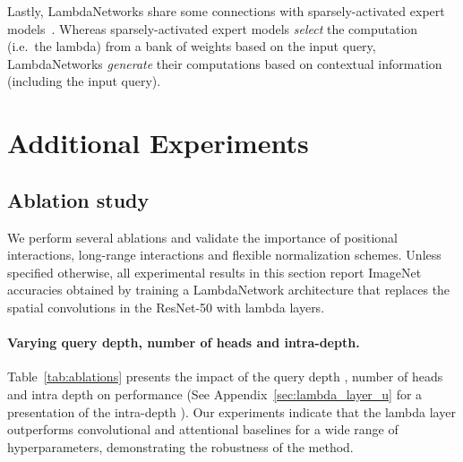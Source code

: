 \documentclass{article} \usepackage{iclr2021_conference,times}
\begin{document}
Lastly, LambdaNetworks share some connections with sparsely-activated expert models~\citep{shazeer2017outrageously,fedus2021switch}.
Whereas sparsely-activated expert models \emph{select} the computation (i.e.\ the lambda) from a bank of weights based on the input query, LambdaNetworks \emph{generate} their computations based on contextual information (including the input query).
 \newpage
\section{Additional Experiments\label{sec:additional_experiments}}

\subsection{Ablation study~\label{sec:additional_ablations}}
We perform several ablations and validate the importance of positional interactions, long-range interactions and flexible normalization schemes.
Unless specified otherwise, all experimental results in this section report ImageNet accuracies obtained by training a LambdaNetwork architecture that replaces the spatial convolutions in the ResNet-50 with lambda layers.

\vspace{-0.1cm}
\paragraph{Varying query depth, number of heads and intra-depth.\label{sec:kh_ablations}}
Table~\ref{tab:ablations} presents the impact of the query depth , number of heads  and intra depth  on performance (See Appendix~\ref{sec:lambda_layer_u} for a presentation of the intra-depth ).
Our experiments indicate that the lambda layer outperforms convolutional and attentional baselines for a wide range of hyperparameters, demonstrating the robustness of the method.
\end{document}
